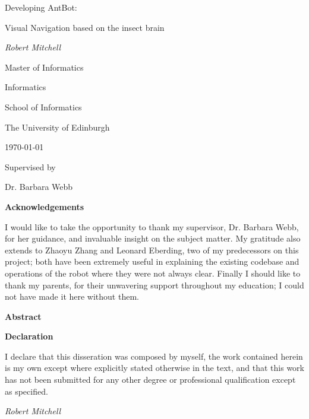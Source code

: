 \documentclass[a4paper,12pt]{article}
\begin{document}
\centering
\vspace*{5cm}
{\huge Developing AntBot: \par Visual Navigation based on the insect brain \par}
\vspace{1cm}
{\itshape Robert Mitchell}

\vspace{2cm}

{\large Master of Informatics \par}
{\large Informatics \par}
{\large School of Informatics \par}
{\large The University of Edinburgh \par}
\large \today \par

\vfill
Supervised by\par
Dr. Barbara Webb

\newpage

\centering
{\LARGE \textbf{Acknowledgements}}
\begin{flushleft}
 {\small
  I would like to take the opportunity to thank my supervisor, Dr. Barbara Webb, for her
  guidance, and invaluable insight on the subject matter. My gratitude also extends to
  Zhaoyu Zhang and Leonard Eberding, two of my predecessors on this project; both have been
  extremely useful in explaining the existing codebase and operations of the robot where they
  were not always clear. Finally I should like to thank my parents, for their unwavering support
  throughout my education; I could not have made it here without them. }
\end{flushleft}  

\newpage
\centering
{\LARGE\textbf{Abstract}}
\begin{flushleft}
{\small }
\end{flushleft}

\newpage

\centering
{\LARGE\textbf{Declaration}}
\begin{flushleft}
  {\small
    I declare that this disseration was composed by myself, the work
    contained herein is my own except where explicitly stated otherwise
    in the text, and that this work has not been submitted for any other
    degree or professional qualification except as specified.
    \par 

    \textit{Robert Mitchell}}

\end{flushleft}
\end{document}

